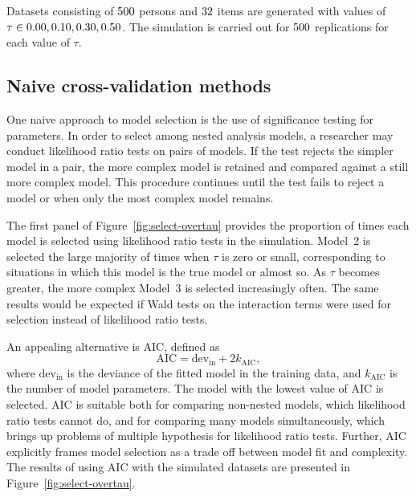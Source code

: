 \documentclass[12pt, letterpaper]{article}
\begin{document}
Datasets consisting of $500$ persons and $32$ items are generated with values of $\tau \in 0.00, 0.10, 0.30, {} 0.50$. The simulation is carried out for $500$ replications for each value of $\tau$. 


\subsection{Naive cross-validation methods}

One naive approach to model selection is the use of significance testing for parameters. In order to select among nested analysis models, a researcher may conduct likelihood ratio tests on pairs of models. If the test rejects the simpler model in a pair, the more complex model is retained and compared against a still more complex model. This procedure continues until the test fails to reject a model or when only the most complex model remains.

The first panel of Figure~\ref{fig:select-overtau} provides the proportion of times each model is selected using likelihood ratio tests in the simulation.
Model~2 is selected the large majority of times when $\tau$ is zero or small, corresponding to situations in which this model is the true model or almost so.
As $\tau$ becomes greater, the more complex Model~3 is selected increasingly often.
The same results would be expected if Wald tests on the interaction terms were used for selection instead of likelihood ratio tests.

An appealing alternative is AIC, defined as
\begin{equation} \label{eq:aic}
\mathrm{AIC} = \mathrm{dev_{in}} + 2k_\mathrm{AIC}
,\end{equation}
where $\mathrm{dev_{in}}$ is the deviance of the fitted model in the training data, and $k_\mathrm{AIC}$ is the number of model parameters. The model with the lowest value of AIC is selected.
AIC is suitable both for comparing non-nested models, which likelihood ratio tests cannot do, and for comparing many models simultaneously, which brings up problems of multiple hypothesis for likelihood ratio tests. Further, AIC explicitly frames model selection as a trade off between model fit and complexity.
The results of using AIC with the simulated datasets are presented in Figure~\ref{fig:select-overtau}. 
\end{document}
